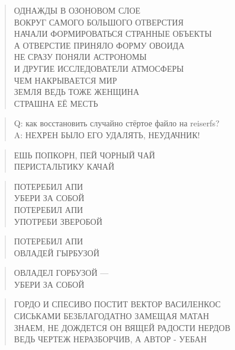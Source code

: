 \poemtitle{***}
\begin{verse}
ОДНАЖДЫ В ОЗОНОВОМ СЛОЕ\\
ВОКРУГ САМОГО БОЛЬШОГО ОТВЕРСТИЯ\\
НАЧАЛИ ФОРМИРОВАТЬСЯ СТРАННЫЕ ОБЪЕКТЫ\\
А ОТВЕРСТИЕ ПРИНЯЛО ФОРМУ ОВОИДА\\
НЕ СРАЗУ ПОНЯЛИ АСТРОНОМЫ\\
И ДРУГИЕ ИССЛЕДОВАТЕЛИ АТМОСФЕРЫ\\
ЧЕМ НАКРЫВАЕТСЯ МИР\\
ЗЕМЛЯ ВЕДЬ ТОЖЕ ЖЕНЩИНА\\
СТРАШНА ЕЁ МЕСТЬ
\end{verse}

\poemtitle{***}
\begin{verse}
Q: как восстановить случайно стёртое файло на reiserfs?\\
A: НЕХРЕН БЫЛО ЕГО УДАЛЯТЬ, НЕУДАЧНИК!
\end{verse}

\poemtitle{***}
\begin{verse}
ЕШЬ ПОПКОРН, ПЕЙ ЧОРНЫЙ ЧАЙ\\
ПЕРИСТАЛЬТИКУ КАЧАЙ
\end{verse}

\poemtitle{***}
\begin{verse}
ПОТЕРЕБИЛ АПИ\\
УБЕРИ ЗА СОБОЙ\\
ПОТЕРЕБИЛ АПИ\\
УПОТРЕБИ ЗВЕРОБОЙ
\end{verse}

\poemtitle{***}
\begin{verse}
ПОТЕРЕБИЛ АПИ\\
ОВЛАДЕЙ ГЫРБУЗОЙ
\end{verse}

\poemtitle{***}
\begin{verse}
ОВЛАДЕЛ ГОРБУЗОЙ —\\
УБЕРИ ЗА СОБОЙ
\end{verse}

\poemtitle{***}
\begin{verse}
ГОРДО И СПЕСИВО ПОСТИТ ВЕКТОР ВАСИЛЕНКОС\\
СИСЬКАМИ БЕЗБЛАГОДАТНО ЗАМЕЩАЯ МАТАН\\
ЗНАЕМ, НЕ ДОЖДЕТСЯ ОН ВЯЩЕЙ РАДОСТИ НЕРДОВ\\
ВЕДЬ ЧЕРТЕЖ НЕРАЗБОРЧИВ, А АВТОР - УЕБАН
\end{verse}

